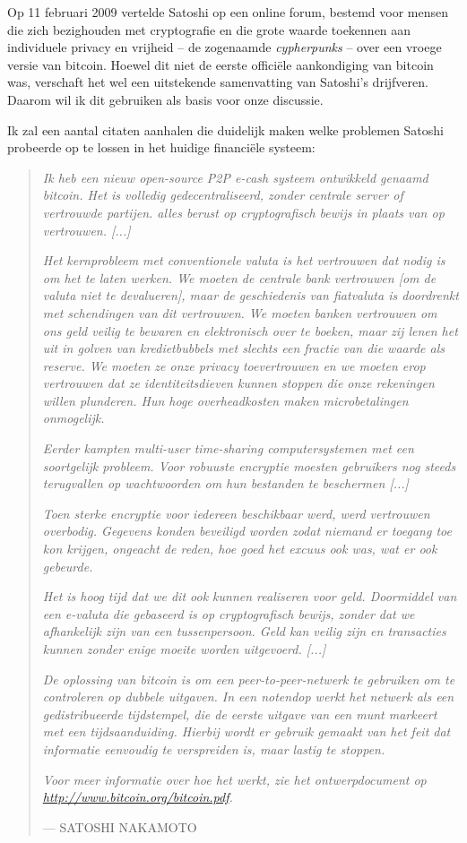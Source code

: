 Op 11 februari 2009 vertelde Satoshi op een online forum, bestemd voor mensen die zich bezighouden met cryptografie en die grote waarde toekennen aan individuele privacy en vrijheid – de zogenaamde \textit{cypherpunks} – over een vroege versie van bitcoin. Hoewel dit niet de eerste officiële aankondiging van bitcoin was, verschaft het wel een uitstekende samenvatting van Satoshi's drijfveren. Daarom wil ik dit gebruiken als basis voor onze discussie.

Ik zal een aantal citaten aanhalen die duidelijk maken welke problemen Satoshi probeerde op te lossen in het huidige financiële systeem:

\begin{quote}
\textit{Ik heb een nieuw open-source P2P e-cash systeem ontwikkeld genaamd bitcoin. Het is volledig gedecentraliseerd, zonder centrale server of vertrouwde partijen. alles berust op cryptografisch bewijs in plaats van op vertrouwen. [...]}

\textit{Het kernprobleem met conventionele valuta is het vertrouwen dat nodig is om het te laten werken. We moeten de centrale bank vertrouwen [om de valuta niet te devalueren], maar de geschiedenis van fiatvaluta is doordrenkt met schendingen van dit vertrouwen. We moeten banken vertrouwen om ons geld veilig te bewaren en elektronisch over te boeken, maar zij lenen het uit in golven van kredietbubbels met slechts een fractie van die waarde als reserve. We moeten ze onze privacy toevertrouwen en we moeten erop vertrouwen dat ze identiteitsdieven kunnen stoppen die onze rekeningen willen plunderen. Hun hoge overheadkosten maken microbetalingen onmogelijk.}

\textit{Eerder kampten \textit{multi-user time-sharing} computersystemen met een soortgelijk probleem. Voor robuuste encryptie moesten gebruikers nog steeds terugvallen op wachtwoorden om hun bestanden te beschermen [...]}

\textit{Toen sterke encryptie voor iedereen beschikbaar werd, werd vertrouwen overbodig. Gegevens konden beveiligd worden zodat niemand er toegang toe kon krijgen, ongeacht de reden, hoe goed het excuus ook was, wat er ook gebeurde.}

\textit{Het is hoog tijd dat we dit ook kunnen realiseren voor geld. Doormiddel van een e-valuta die gebaseerd is op cryptografisch bewijs, zonder dat we afhankelijk zijn van een tussenpersoon. Geld kan veilig zijn en transacties kunnen zonder enige moeite worden uitgevoerd. [...]}

\textit{De oplossing van bitcoin is om een peer-to-peer-netwerk te gebruiken om te controleren op dubbele uitgaven. In een notendop werkt het netwerk als een gedistribueerde tijdstempel, die de eerste uitgave van een munt markeert met een tijdsaanduiding. Hierbij wordt er gebruik gemaakt van het feit dat informatie eenvoudig te verspreiden is, maar lastig te stoppen.}

\textit{Voor meer informatie over hoe het werkt, zie het ontwerpdocument op \href{http://www.bitcoin.org/bitcoin.pdf}{http://www.bitcoin.org/bitcoin.pdf}.}
\par\raggedleft--- \textup{SATOSHI NAKAMOTO}
\end{quote}

